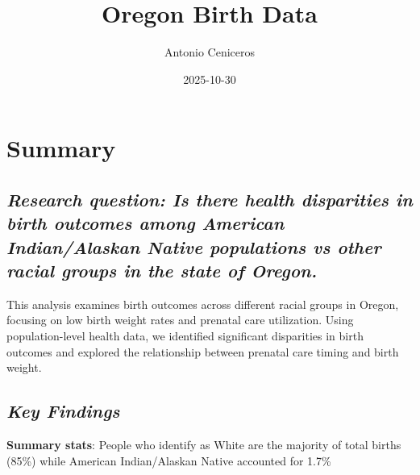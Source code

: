 \documentclass[
]{article}
\title{Oregon Birth Data}
\author{Antonio Ceniceros}
\date{2025-10-30}
\begin{document}
\maketitle

\hypertarget{summary}{%
\section{Summary}\label{summary}}

\hypertarget{research-question-is-there-health-disparities-in-birth-outcomes-among-american-indianalaskan-native-populations-vs-other-racial-groups-in-the-state-of-oregon.}{%
\subsection{\texorpdfstring{\emph{Research question: Is there health
disparities in birth outcomes among American Indian/Alaskan Native
populations vs other racial groups in the state of
Oregon.}}{Research question: Is there health disparities in birth outcomes among American Indian/Alaskan Native populations vs other racial groups in the state of Oregon.}}\label{research-question-is-there-health-disparities-in-birth-outcomes-among-american-indianalaskan-native-populations-vs-other-racial-groups-in-the-state-of-oregon.}}

This analysis examines birth outcomes across different racial groups in
Oregon, focusing on low birth weight rates and prenatal care
utilization. Using population-level health data, we identified
significant disparities in birth outcomes and explored the relationship
between prenatal care timing and birth weight.

\hypertarget{key-findings}{%
\subsection{\texorpdfstring{\emph{Key
Findings}}{Key Findings}}\label{key-findings}}

\textbf{Summary stats}: People who identify as White are the majority of
total births (85\%) while American Indian/Alaskan Native accounted for
1.7\%
\end{document}
